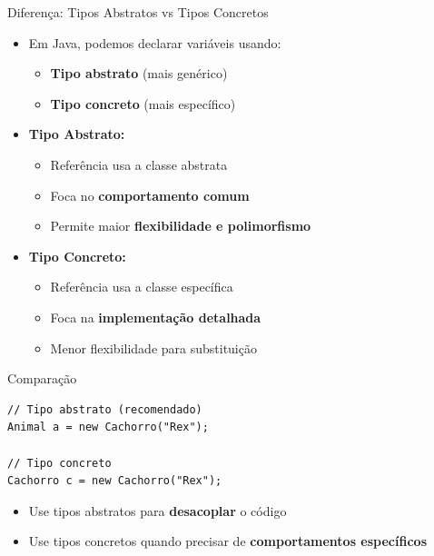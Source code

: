 \documentclass[9pt]{beamer}
\begin{document}
\begin{frame}[fragile]{Diferença: Tipos Abstratos vs Tipos Concretos}
\begin{itemize}
    \item Em Java, podemos declarar variáveis usando:
    \begin{itemize}
        \item \textbf{Tipo abstrato} (mais genérico)
        \item \textbf{Tipo concreto} (mais específico)
    \end{itemize}
    
    \item \textbf{Tipo Abstrato:}
    \begin{itemize}
        \item Referência usa a classe abstrata
        \item Foca no \textbf{comportamento comum}
        \item Permite maior \textbf{flexibilidade e polimorfismo}
    \end{itemize}
    
    \item \textbf{Tipo Concreto:}
    \begin{itemize}
        \item Referência usa a classe específica
        \item Foca na \textbf{implementação detalhada}
        \item Menor flexibilidade para substituição
    \end{itemize}
\end{itemize}

\vspace{0.3cm}

\begin{block}{Comparação}
\begin{verbatim}
// Tipo abstrato (recomendado)
Animal a = new Cachorro("Rex");

// Tipo concreto
Cachorro c = new Cachorro("Rex");
\end{verbatim}
\end{block}

\vspace{0.3cm}

\begin{itemize}
    \item Use tipos abstratos para \textbf{desacoplar} o código
    \item Use tipos concretos quando precisar de \textbf{comportamentos específicos}
\end{itemize}

\end{frame}
\end{document}
